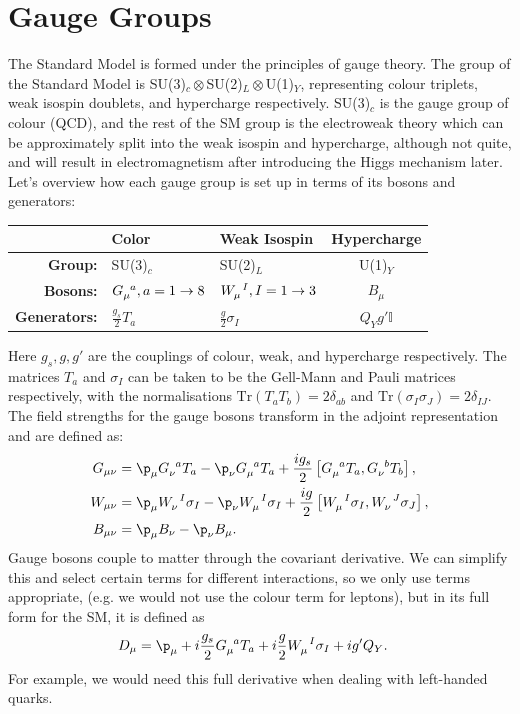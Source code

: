 \documentclass[a4paper, 11pt, normalem]{report}
\begin{document}
\section{Gauge Groups}
The Standard Model is formed under the principles of gauge theory.
The group of the Standard Model is SU(3)$_c\otimes$SU(2)$_L\otimes$U(1)$_Y$, representing colour triplets, weak isospin doublets, and hypercharge respectively.
SU(3)$_c$ is the gauge group of colour (QCD), and the rest of the SM group is the electroweak theory which can be approximately split into the weak isospin and hypercharge, although not quite, and will result in electromagnetism after introducing the Higgs mechanism later.
Let's overview how each gauge group is set up in terms of its bosons and generators:
\begin{table}[H]
    \centering
    \begin{tabular}{r|llc}
        \hline\hline
        & \textbf{Color} & \textbf{Weak Isospin} & \textbf{Hypercharge} \\
        \hline\hline
        \textbf{Group:} & SU(3)$_c$ & SU(2)$_L$ & U(1)$_Y$ \\
        \textbf{Bosons:} & $\tensor{G}{_\mu^a},a=1\to8$ & $\tensor{W}{_\mu^I},I=1\to3$ & $B_\mu$ \\
        \textbf{Generators:} & $\frac{g_s}{2}T_a$ & $\frac{g}{2}\sigma_I$ & $Q_Y g'\mathbb{I}$ \\
        \hline\hline
    \end{tabular}
\end{table}
Here $g_s,g,g'$ are the couplings of colour, weak, and hypercharge respectively.
The matrices $T_a$ and $\sigma_I$ can be taken to be the Gell-Mann and Pauli matrices respectively, with the normalisations $\text{Tr}(T_aT_b) = 2\delta_{ab}$ and $\text{Tr}(\sigma_I\sigma_J) = 2\delta_{IJ}$.
The field strengths for the gauge bosons transform in the adjoint representation and are defined as:
\begin{align}
    G_{\mu\nu} &= \p_\mu \tensor{G}{_\nu^a}T_a - \p_\nu\tensor{G}{_\mu^a}T_a + \frac{ig_s}{2}\left[\tensor{G}{_\mu^a}T_a,\tensor{G}{_\nu^b}T_b\right], \\
    W_{\mu\nu} &= \p_\mu \tensor{W}{_\nu^I}\sigma_I - \p_\nu\tensor{W}{_\mu^I}\sigma_I + \frac{ig}{2}\left[\tensor{W}{_\mu^I}\sigma_I,\tensor{W}{_\nu^J}\sigma_J\right],  \\
    B_{\mu\nu} &= \p_\mu B_\nu - \p_\nu B_\mu.
\end{align}
Gauge bosons couple to matter through the covariant derivative.
We can simplify this and select certain terms for different interactions, so we only use terms appropriate, (e.g. we would not use the colour term for leptons), but in its full form for the SM, it is defined as
\begin{align}
    D_\mu &= \p_\mu + i\frac{g_s}{2}\tensor{G}{_\mu^a}T_a + i\frac{g}{2}\tensor{W}{_\mu^I}\sigma_I + ig'Q_Y.
\end{align}
For example, we would need this full derivative when dealing with left-handed quarks.
\end{document}

